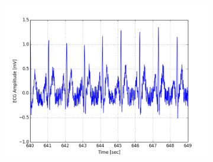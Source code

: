 \documentclass[paper=a4, fontsize=11pt]{scrartcl}
\numberwithin{equation}{section}		%
\numberwithin{figure}{section}			%
\numberwithin{table}{section}		    %
\begin{document}
\begin{appendices}
\begin{figure}[H]
\begin{subfigure}[b]{0.3\textwidth}
		\includegraphics[width=\textwidth]{sim/ecg_18}
	\end{subfigure}
\end{figure}


\end{appendices}
\end{document}
